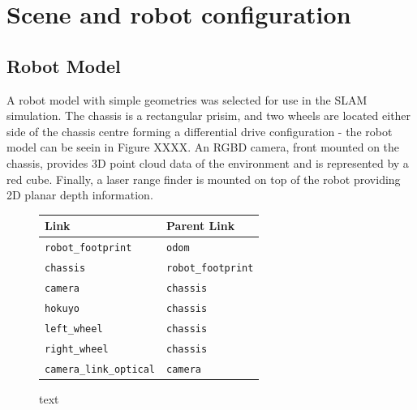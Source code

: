 \documentclass[a4paper]{article}
\begin{document}
\section{Scene and robot configuration}
\subsection{Robot Model}
A robot model with simple geometries was selected for use in the SLAM simulation. The chassis is a rectangular prisim, and two wheels are located either side of the chassis centre forming a differential drive configuration - the robot model can be seein in Figure XXXX. An RGBD camera, front mounted on the chassis, provides 3D point cloud data of the environment and is represented by a red cube. Finally, a laser range finder is mounted on top of the robot providing 2D planar depth information.\\

\begin{figure}[h]
\begin{minipage}{0.45\textwidth}
	\centering
	\caption{text}
\end{minipage}
\hspace{1cm}
\begin{minipage}{0.45\textwidth}
	\begin{tabular}{ll}
		\toprule
		\textbf{Link} & \textbf{Parent Link} \\
		\midrule
		\texttt{robot\_footprint} & \texttt{odom} \\
		\texttt{chassis} & \texttt{robot\_footprint} \\
		\texttt{camera} & \texttt{chassis} \\
		\texttt{hokuyo} & \texttt{chassis} \\
		\texttt{left\_wheel} & \texttt{chassis} \\
		\texttt{right\_wheel} & \texttt{chassis} \\
		\texttt{camera\_link\_optical} & \texttt{camera} \\
		\bottomrule
	\end{tabular}
\end{minipage}
\end{figure}
\end{document}
